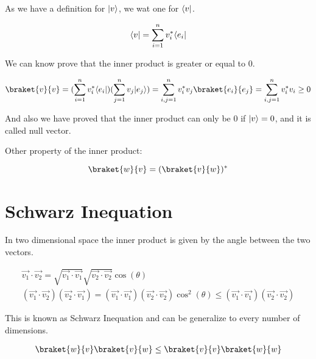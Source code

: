 As we have a definition for $\lvert v\rangle$, we wat one for $\langle v\rvert$.

\begin{equation}
  \label{6.5}
  \langle v\rvert = \sum_{i=1}^{n} v_i^{*}\langle e_i\rvert
\end{equation}

We can know prove that the inner product is greater or equal to 0.

\begin{equation}
  \label{6.6}
  \braket{v}{v} = (\sum_{i=1}^{n} v_i^{*}\bra{e_i})(\sum_{j=1}^{n} v_j \ket{e_j}) = \sum_{i,j=1}^{n} v_i^{*} v_j \braket{e_i}{e_j} = \sum_{i,j=1}^{n} v_i^{*} v_i \geq 0
\end{equation}

And also we have proved that the inner product can only be 0 if $\lvert v\rangle = 0$, and it is called null vector.

Other property of the inner product:


\begin{equation}
  \label{6.7}
  \braket{w}{v} = (\braket{v}{w})^{*}
\end{equation}

\section{Schwarz Inequation}

In two dimensional space the inner product is given by the angle between the two vectors.

\begin{equation}
  \label{6.8}
  \begin{array}{c}
    \vec{v_1} \cdot \vec{v_2} = \sqrt{\vec{v_1}\cdot\vec{v_1}} \sqrt{\vec{v_2}\cdot\vec{v_2}} \cos(\theta)
    \\
    (\vec{v_1} \cdot \vec{v_2})(\vec{v_2} \cdot \vec{v_1}) = (\vec{v_1}\cdot\vec{v_1})  (\vec{v_2}\cdot\vec{v_2}) \cos^2(\theta) \leq (\vec{v_1}\cdot\vec{v_1})  (\vec{v_2}\cdot\vec{v_2})
  \end{array}
\end{equation}

This is known as Schwarz Inequation and can be generalize to every number of dimensions.

\begin{equation}
  \label{6.9}
  \begin{array}{c}
    \braket{w}{v}\braket{v}{w} \leq \braket{v}{v} \braket{w}{w}
  \end{array}
\end{equation}






